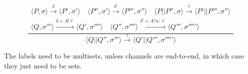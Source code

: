 \documentclass[times,10pt]{article}
\begin{document}
$$    \frac{\begin{matrix} \langle P, \sigma \rangle \xrightarrow{\delta} \langle P', \sigma' \rangle \quad \langle P'', \sigma' \rangle \xrightarrow{\delta'} \langle P''', \sigma'' \rangle \quad \langle P || P'', \sigma \rangle \xrightarrow{\tau} \langle P' || P''', \sigma'' \rangle \\ \langle Q, \sigma''' \rangle \xrightarrow{\delta + A!\ell} \langle Q', \sigma'''' \rangle \quad \langle Q'', \sigma'''' \rangle \xrightarrow{\delta' + A?a : \ell} \langle Q''', \sigma''''' \rangle \end{matrix}}{\langle Q || Q'', \sigma''' \rangle \xrightarrow{\tau} \langle Q' || Q''', \sigma''''' \rangle}
$$

The labels need to be multisets, unless channels are end-to-end, in which case they just need to be sets.
\end{document}
